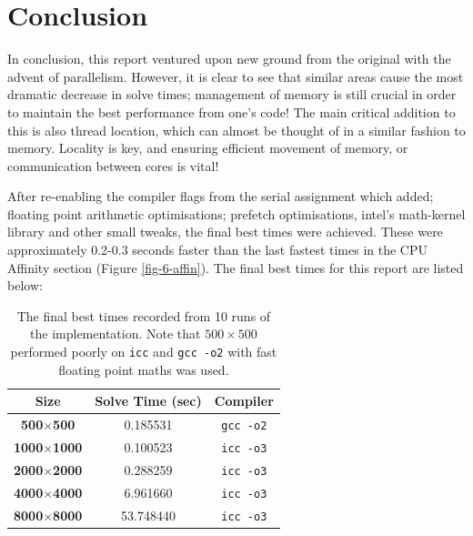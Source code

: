 \documentclass[11pt,twocolumn,a4paper]{article}
\begin{document}
\section{Conclusion}
In conclusion, this report ventured upon new ground from the original with the advent of parallelism. However, it is clear to see that similar areas cause the most dramatic decrease in solve times; management of memory is still crucial in order to maintain the best performance from one's code! The main critical addition to this is also thread location, which can almost be thought of in a similar fashion to memory. Locality is key, and ensuring efficient movement of memory, or communication between cores is vital! \par

After re-enabling the compiler flags from the serial assignment which added; floating point arithmetic optimisations; prefetch optimisations, intel's math-kernel library and other small tweaks, the final best times were achieved. These were approximately 0.2-0.3 seconds faster than the last fastest times in the CPU Affinity section (Figure \ref{fig-6-affin}). The final best times for this report are listed below: \par

\begin{table}[h]
\begin{adjustwidth}{-0.15cm}{}
\small
\centering
\begin{tabular}{c|c|c}
\textbf{Size} & \textbf{Solve Time (sec)} & \textbf{Compiler} \\ \hline
\textbf{500$\times$500}   & 0.185531 & \texttt{gcc -o2} \\
\textbf{1000$\times$1000} & 0.100523 & \texttt{icc -o3} \\
\textbf{2000$\times$2000} & 0.288259 & \texttt{icc -o3} \\
\textbf{4000$\times$4000} & 6.961660 & \texttt{icc -o3} \\
\textbf{8000$\times$8000} & 53.748440 & \texttt{icc -o3}

\end{tabular}
\caption{The final best times recorded from 10 runs of the implementation. Note that $500\times500$ performed poorly on \texttt{icc} and \texttt{gcc -o2} with fast floating point maths was used.}
\label{finalResults}
\end{adjustwidth}
\end{table}\par
\vspace{-0.22cm}

\end{document}
